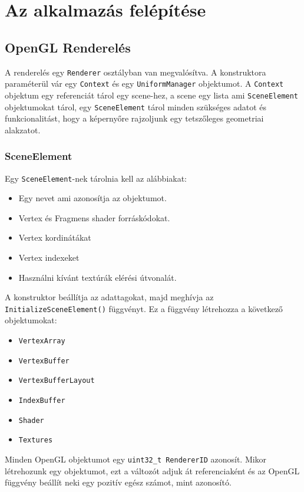 \chapter{Az alkalmazás felépítése}

\section{OpenGL Renderelés}

A renderelés egy \verb|Renderer| osztályban van megvalósítva. A konstruktora paraméterül vár egy \verb|Context| és egy \verb|UniformManager| objektumot. A \verb|Context| objektum egy referenciát tárol egy scene-hez, a scene egy lista ami \verb|SceneElement| objektumokat tárol, egy \verb|SceneElement| tárol minden  szükséges adatot és funkcionalitást, hogy a képernyőre rajzoljunk egy tetszőleges geometriai alakzatot.

\subsection{SceneElement}

Egy \verb|SceneElement|-nek tárolnia kell az alábbiakat:
\begin{itemize}
    \item Egy nevet ami azonosítja az objektumot.
    \item Vertex és Fragmens shader forráskódokat.
    \item Vertex kordinátákat
    \item Vertex indexeket
    \item Használni kívánt textúrák elérési útvonalát.
\end{itemize}

A konstruktor beállítja az adattagokat, majd meghívja az \newline \verb|InitializeSceneElement()| függvényt. Ez a függvény létrehozza a következő objektumokat:

\begin{itemize}
    \item \verb|VertexArray|
    \item \verb|VertexBuffer|
    \item \verb|VertexBufferLayout|
    \item \verb|IndexBuffer|
    \item \verb|Shader|
    \item \verb|Textures|
\end{itemize}

Minden OpenGL objektumot egy \verb|uint32_t RendererID| azonosít. Mikor létrehozunk egy objektumot, ezt a változót adjuk át referenciaként és az OpenGL függvény beállít neki egy pozitív egész számot, mint azonosító.


